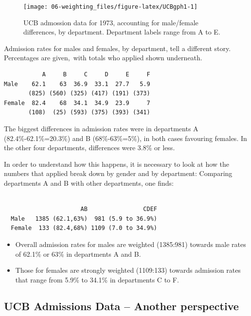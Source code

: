 \documentclass[
  10pt,
  b5paper]{book}
\providecommand{\tightlist}{%
  \setlength{\itemsep}{0pt}\setlength{\parskip}{0pt}}
\begin{document}
\begin{figure}[H]

{\centering \texttt{[image: 06-weighting\_files/figure-latex/UCBgph1-1]} 

}

\caption{UCB admossion data for 1973, accounting for male/female differences, by department.  Department labels range from A to E.}\label{fig:UCBgph1}
\end{figure}

Admission rates for males and females, by department, tell a different
story. Percentages are given,~with totals who applied shown underneath.

\begin{verbatim}
           A     B     C     D     E     F
Male    62.1    63  36.9  33.1  27.7   5.9
       (825) (560) (325) (417) (191) (373)
Female  82.4    68  34.1  34.9  23.9     7
       (108)  (25) (593) (375) (393) (341)
\end{verbatim}

The biggest differences in admission rates were in departments
A (82.4\%-62.1\%=20.3\%) and B (68\%-63\%=5\%), in both cases favouring females.
In the other four departments, differences were 3.8\% or less.

In order to understand how this happens, it is necessary to look
at how the numbers that applied break down by gender and by department:
Comparing departments A and B with other departments, one finds:

\begin{verbatim}
        
                      AB                CDEF
  Male   1385 (62.1,63%)  981 (5.9 to 36.9%)
  Female  133 (82.4,68%) 1109 (7.0 to 34.9%)
\end{verbatim}

\begin{itemize}
\tightlist
\item
  Overall admission rates for males are weighted (1385:981) towards
  male rates of 62.1\% or 63\% in departments A and B.
\item
  Those for females are strongly weighted (1109:133) towards admission rates that range from 5.9\% to 34.1\% in departments C to F.
\end{itemize}

\hypertarget{ucb-admissions-data-another-perspective}{%
\subsection*{UCB Admissions Data -- Another perspective}\label{ucb-admissions-data-another-perspective}}
\end{document}
